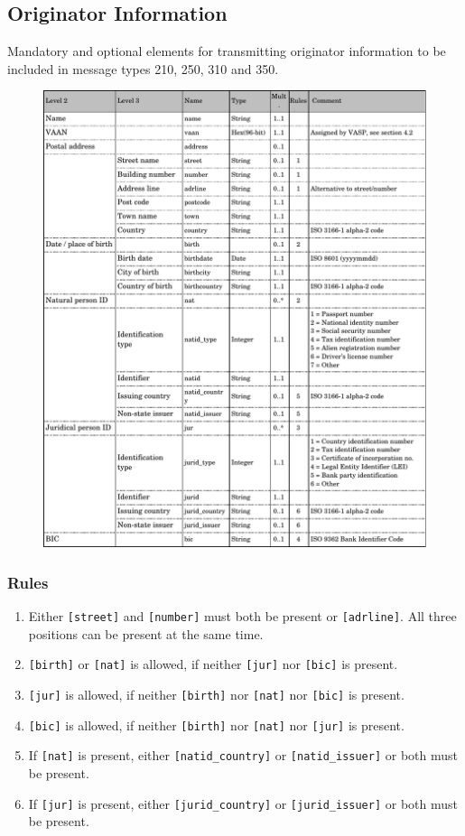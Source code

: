 \documentclass{article}
\begin{document}
\newpage
\subsection{Originator Information}
Mandatory and optional elements for transmitting originator information to be included in message types 210, 250, 310 and 350.
\begin{figure}[h]
    \centering
    \includegraphics[width=\textwidth]{g28.pdf}
\end{figure}
\newpage
\subsubsection{Rules}
\begin{enumerate}
\item Either \verb+[street]+ and \verb+[number]+ must both be present or \verb+[adrline]+. All three positions can be present at the same time.
\item \verb+[birth]+ or \verb+[nat]+ is allowed, if neither \verb+[jur]+ nor \verb+[bic]+ is present.
\item \verb+[jur]+ is allowed, if neither \verb+[birth]+ nor \verb+[nat]+ nor \verb+[bic]+ is present.
\item \verb+[bic]+ is allowed, if neither \verb+[birth]+ nor \verb+[nat]+ nor \verb+[jur]+ is present.
\item If \verb+[nat]+ is present, either \verb+[natid_country]+ or \verb+[natid_issuer]+ or both must be present.
\item If \verb+[jur]+ is present, either \verb+[jurid_country]+ or \verb+[jurid_issuer]+ or both must be present.
\end{enumerate}
\newpage
\end{document}
